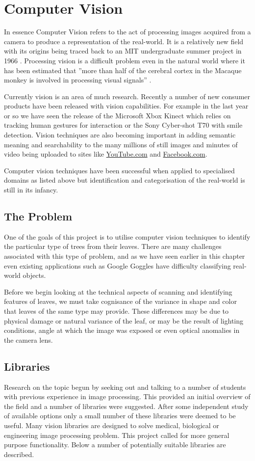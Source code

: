 \section{Computer Vision}
In essence Computer Vision refers to the act of processing images acquired from a camera to produce a representation of the real-world.  It is a relatively new field with its origins being traced back to an MIT undergraduate summer project in 1966 \cite{feili10}. Processing vision is a difficult problem even in the natural world where it has been estimated that ”more than half of the cerebral cortex in the Macaque monkey is involved in processing visual signals” \cite{wilson99}.

Currently vision is an area of much research. Recently a number of new consumer products have been released with vision capabilities. For example in the last year or so we have seen the release of the Microsoft Xbox Kinect which relies on tracking human gestures for interaction or the Sony Cyber-shot T70 with smile detection.  Vision techniques are also becoming important in adding semantic meaning and searchability to the many millions of still images and minutes of video being uploaded to sites like \url{YouTube.com} and \url{Facebook.com}. 

Computer vision techniques have been successful when applied to specialised domains as listed above but identification and categorisation of the real-world is still in its infancy.

\subsection{The Problem}
One of the goals of this project is to utilise computer vision techniques to identify the particular type of trees from their leaves. There are many challenges associated with this type of problem, and as we have seen earlier in this chapter even existing applications such as Google Goggles have difficulty classifying real-world objects.

Before we begin looking at the technical aspects of scanning and identifying features of leaves, we must take cognisance of the variance in shape and color that leaves of the same type may provide. These differences may be due to physical damage or natural variance of the leaf, or may be the result of lighting conditions, angle at which the image was exposed or even optical anomalies in the camera lens.

\subsection{Libraries}
Research on the topic begun by seeking out and talking to a number of students with previous experience in image processing. This provided an initial overview of the field and a number of libraries were suggested. After some independent study of available options only a small number of these libraries were deemed to be useful. Many vision libraries are designed to solve medical, biological or engineering image processing problem. This project called for more general purpose functionality. Below a number of potentially suitable libraries are described.

